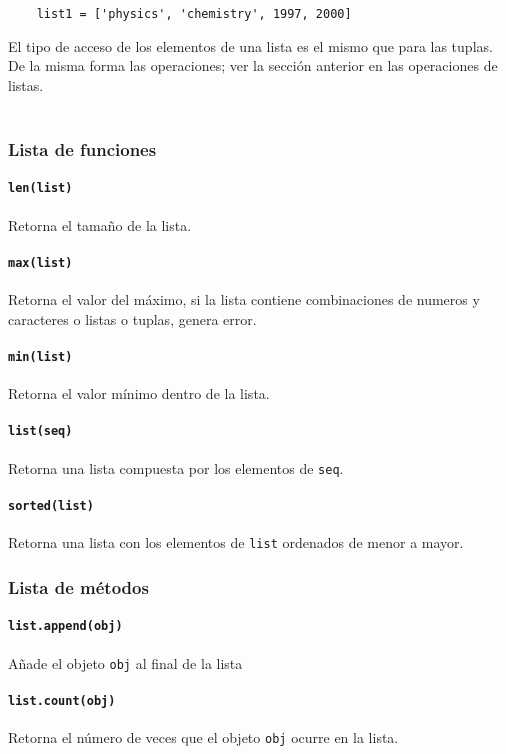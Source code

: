 \begin{verbatim}
    list1 = ['physics', 'chemistry', 1997, 2000]
\end{verbatim}

El tipo de acceso de los elementos de una lista es el mismo que para las
tuplas. De la misma forma las operaciones; ver la sección anterior en las
operaciones de listas. \\\

\subsubsection{Lista de funciones}

\paragraph{\texttt{len(list)}} Retorna el tamaño de la lista.
\paragraph{\texttt{max(list)}} Retorna el valor del máximo, si la lista
contiene combinaciones de numeros y caracteres o listas o tuplas, genera error.
\paragraph{\texttt{min(list)}} Retorna el valor mínimo dentro de la lista.
\paragraph{\texttt{list(seq)}} Retorna una lista compuesta por los elementos de
\texttt{seq}.
\paragraph{\texttt{sorted(list)}} Retorna una lista con los elementos de
\texttt{list} ordenados de menor a mayor.

\subsubsection{Lista de métodos}

\paragraph{\texttt{list.append(obj)}} Añade el objeto \texttt{obj} al final de
la lista

\paragraph{\texttt{list.count(obj)}} Retorna el número de veces que el objeto
\texttt{obj} ocurre en la lista.

